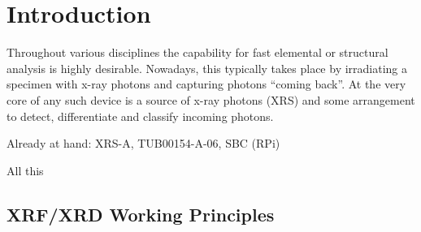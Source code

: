 \chapter{Introduction}\label{chap:intro}
%
%
%
%
%
%
%
%
%
%
%
%
%
%
%
%
%
%
%
%

Throughout various disciplines the capability for fast elemental or structural analysis is highly desirable.
Nowadays, this typically takes place by irradiating a specimen with x-ray photons and capturing photons ``coming back''.
At the very core of any such device is a source of x-ray photons (XRS) and some arrangement to detect, differentiate and classify incoming photons.\par\medskip

Already at hand: XRS-A, TUB00154-A-06, SBC (RPi)

All this 
    \section{XRF/XRD Working Principles}\label{sec:working principles}